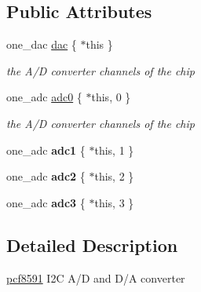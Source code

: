 \subsection*{Public Attributes}
\begin{DoxyCompactItemize}
\item 
one\+\_\+dac \hyperlink{classhwlib_1_1pcf8591_aadaf93d8d554cdab9b97108d1c6f8ab2}{dac} \{ $\ast$this \}\hypertarget{classhwlib_1_1pcf8591_aadaf93d8d554cdab9b97108d1c6f8ab2}{}\label{classhwlib_1_1pcf8591_aadaf93d8d554cdab9b97108d1c6f8ab2}

\begin{DoxyCompactList}\small\item\em the A/D converter channels of the chip \end{DoxyCompactList}\end{DoxyCompactItemize}
{\bf }\par
\begin{DoxyCompactItemize}
\item 
one\+\_\+adc \hyperlink{classhwlib_1_1pcf8591_a29a87f5711fbbd85ed5c477a5eab1b6f}{adc0} \{ $\ast$this, 0 \}
\begin{DoxyCompactList}\small\item\em the A/D converter channels of the chip \end{DoxyCompactList}\item 
one\+\_\+adc {\bfseries adc1} \{ $\ast$this, 1 \}\hypertarget{classhwlib_1_1pcf8591_aa916285265761457b7c95207d2b41118}{}\label{classhwlib_1_1pcf8591_aa916285265761457b7c95207d2b41118}

\item 
one\+\_\+adc {\bfseries adc2} \{ $\ast$this, 2 \}\hypertarget{classhwlib_1_1pcf8591_acb459e70a386e9b62fb0680ea5e84cfb}{}\label{classhwlib_1_1pcf8591_acb459e70a386e9b62fb0680ea5e84cfb}

\item 
one\+\_\+adc {\bfseries adc3} \{ $\ast$this, 3 \}\hypertarget{classhwlib_1_1pcf8591_aa89be33b4b8d5a329120e867e8d8245f}{}\label{classhwlib_1_1pcf8591_aa89be33b4b8d5a329120e867e8d8245f}

\end{DoxyCompactItemize}



\subsection{Detailed Description}
\hyperlink{classhwlib_1_1pcf8591}{pcf8591} I2C A/D and D/A converter 

